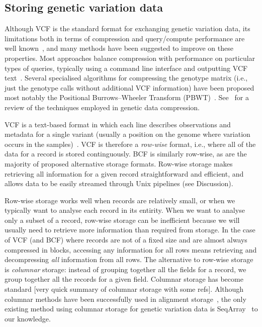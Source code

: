 \documentclass[a4paper,num-refs]{oup-contemporary}
\begin{document}
\subsection{Storing genetic variation data}
Although VCF is the standard format for exchanging genetic variation
data, its limitations both in terms of compression 
and query/compute performance are well 
known~\citep[e.g.][]{kelleher2013processing,layer2016efficient,li2016bgt},
and many methods 
have been suggested to improve on these properties.
Most approaches balance compression with
performance on particular types of queries, 
typically using a command line interface
and outputting VCF text~\citep{
layer2016efficient, %
li2016bgt, %
tatwawadi2016gtrac, %
danek2018gtc, %
lin2020sparse, %
lan2020genozip,lan2021genozip, %
lefaive2021sparse, %
wertenbroek2022xsi,%
zhang2023gbc}. %
Several specialised algorithms for compressing 
the genotype matrix (i.e., just the genotype calls without additional
VCF information) have been proposed
\citep{deorowicz2013genome, %
deorowicz2019gtshark, %
deorowicz2021vcfshark, %
dehaas2024genotype} %
most notably the Positional
Burrows--Wheeler Transform (PBWT)~\citep{durbin2014efficient}.
See~\citep{mcvean2019linkage} for a review of the techniques
employed in genetic data compression.

VCF is a text-based format in which each line
describes observations
and metadata for a single variant (usually a position on the genome
where variation occurs in the samples)~\citep{danecek2011variant}. 
VCF is therefore a \emph{row-wise} format, i.e., where all of the 
data for a record is stored continguously. BCF is similarly 
row-wise, as are the majority of proposed alternative storage formats.
Row-wise storage makes retrieving all information
for a given record straightforward and efficient, and 
allows data to be easily streamed through Unix pipelines (see Discussion).

Row-wise storage works well when records are relatively small, 
or when we typically want to analyse each record in its entirity.
When we want to analyse only a subset of a record,
row-wise storage can be inefficient because we will usually need to
retrieve more information than required from storage. In the case 
of VCF (and BCF) where records are not of a fixed size and 
are almost always compressed in blocks, accessing any information
for all rows means retrieving and decompressing \emph{all} 
information from all rows.
The alternative to row-wise storage is \emph{columnar} storage:
instead of grouping together all the fields for a record,
we group together all the records for a given field.
Columnar storage has become standard [very quick summary of columnar
storage with some refs].
Although columnar methods have been successfully used in alignment 
storage~\citep{bonfield2014scramble,bonfield2022cram},
the only existing method using columnar 
storage for genetic variation data is 
SeqArray~\citep{zheng2017seqarray,zheng2012high} to our knowledge.
\end{document}
